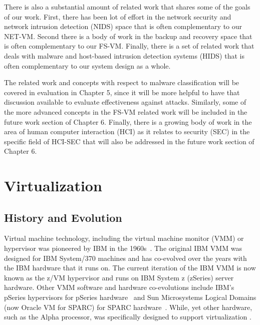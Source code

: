There is also a substantial amount of related work that shares some of the goals of our work. First, there has been lot of effort in the network security and network intrusion detection (NIDS) space that is often complementary to our NET-VM. Second there is a body of work in the backup and recovery space that is often complementary to our FS-VM. Finally, there is a set of related work that deals with malware and host-based intrusion detection systems (HIDS) that is often complementary to our system design as a whole.

The related work and concepts with respect to malware classification will be covered in evaluation in Chapter 5, since it will be more helpful to have that discussion available to evaluate effectiveness against attacks. Similarly, some of the more advanced concepts in the FS-VM related work will be included in the future work section of Chapter 6. Finally, there is a growing body of work in the area of human computer interaction (HCI) as it relates to security (SEC) in the specific field of HCI-SEC that will also be addressed in the future work section of Chapter 6.


\section{Virtualization}

\subsection{History and Evolution}
\label{sec:related-history-evolution}

Virtual machine technology, including the virtual machine monitor (VMM) or hypervisor was pioneered by IBM in the 1960s~\cite{creasy_1981}. The original IBM VMM was designed for IBM System/370 machines and has co-evolved over the years with the IBM hardware that it runs on.  The current iteration of the IBM VMM is now known as the z/VM hypervisor and runs on IBM System z (zSeries) server hardware. Other VMM software and hardware co-evolutions include IBM's pSeries hypervisors for pSeries hardware~\cite{armstrong_power5_2005,blank_p5_2005} and Sun Microsystems Logical Domains (now Oracle VM for SPARC) for SPARC hardware~\cite{sparc_architecture_2005,sparc_vm_2006}. While, yet other hardware, such as the Alpha processor, was specifically designed to support virtualization \cite{karger_2007}. 

